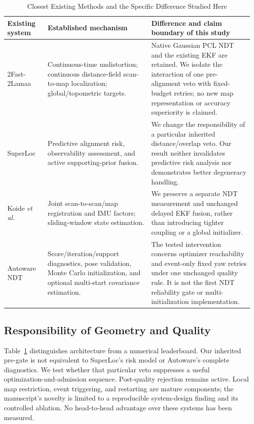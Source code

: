 \documentclass[journal,10pt,letterpaper]{IEEEtran}
\begin{document}
\begin{table}[t]
\caption{Closest Existing Methods and the Specific Difference Studied Here}
\label{tab:related}
\centering\footnotesize
\begin{tabular}{p{}p{}p{}}
\toprule
Existing system & Established mechanism & Difference and claim boundary of this study \\
\midrule
2Fast-2Lamaa~\cite{twofast} & Continuous-time undistortion; continuous distance-field scan-to-map localization; global/topometric targets. & Native Gaussian PCL NDT and the existing EKF are retained. We isolate the interaction of one pre-alignment veto with fixed-budget retries; no new map representation or accuracy superiority is claimed. \\
SuperLoc~\cite{superloc} & Predictive alignment risk, observability assessment, and active supporting-prior fusion. & We change the responsibility of a particular inherited distance/overlap veto. Our result neither invalidates predictive risk analysis nor demonstrates better degeneracy handling. \\
Koide \textit{et al.}~\cite{koide} & Joint scan-to-scan/map registration and IMU factors; sliding-window state estimation. & We preserve a separate NDT measurement and unchanged delayed EKF fusion, rather than introducing tighter coupling or a global initializer. \\
Autoware NDT~\cite{autoware} & Score/iteration/support diagnostics, pose validation, Monte Carlo initialization, and optional multi-start covariance estimation. & The tested intervention concerns optimizer reachability and event-only fixed yaw retries under one unchanged quality rule. It is not the first NDT reliability gate or multi-initialization implementation. \\
\bottomrule
\end{tabular}
\end{table}

\subsection{Responsibility of Geometry and Quality}
Table~\ref{tab:related} distinguishes architecture from a numerical leaderboard. Our inherited pre-gate is not equivalent to SuperLoc's risk model or Autoware's complete diagnostics. We test whether that particular veto suppresses a useful optimization-and-admission sequence. Post-quality rejection remains active. Local map restriction, event triggering, and restarting are mature components; the manuscript's novelty is limited to a reproducible system-design finding and its controlled ablation. No head-to-head advantage over these systems has been measured.
\end{document}
